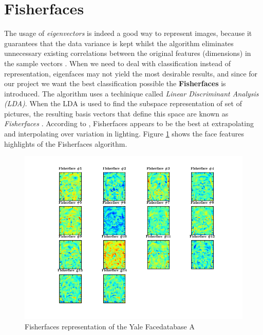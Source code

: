 \documentclass{report}
\begin{document}
\newpage

\section{Fisherfaces}
\label{sec:fisherfaces}
The usage of \textit{eigenvectors} is indeed a good way to represent images, because it guarantees that the data variance is kept whilst the algorithm eliminates unnecessary existing correlations between the original features (dimensions) in the sample vectors \cite{fisherfacec-wiki}. When we need to deal with classification instead of representation, eigenfaces may not yield the most desirable results, and since for our project we want the best classification possible the \textbf{Fisherfaces} is introduced. The algorithm uses a techinique called \textit{Linear Discriminant Analysis (LDA)}. When the LDA is used to find the subspace representation of set of pictures, the resulting basis vectors that define this space are known as \textit{Fisherfaces} \cite{fisherfacec-wiki}.
According to \cite{belhumeur1997eigenfaces}, Fisherfaces appears to be the best at extrapolating and interpolating over variation in lighting. Figure \ref{fig:fisherafaces} shows the face features highlights of the Fisherfaces algorithm.

\begin{figure}[!htb]
  \centering
  \includegraphics[scale=0.7]{images/fisherfaces.png}
  \caption{Fisherfaces representation of the Yale Facedatabase A}
  \label{fig:fisherafaces}
\end{figure}
\end{document}
